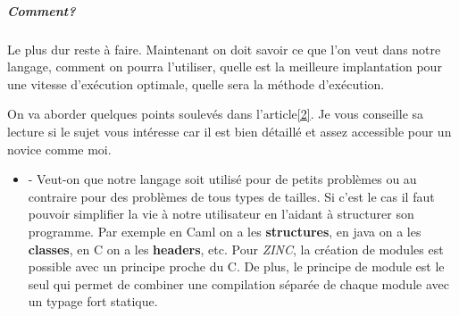 \documentclass[10pt,a4paper]{report}
\begin{document}
\subparagraph{Comment?}	
Le plus dur reste à faire. Maintenant on doit savoir ce que l'on veut dans notre langage, comment on pourra l'utiliser, quelle
est la meilleure implantation pour une vitesse d'exécution optimale, quelle sera la méthode d'exécution. 
\medbreak

On va aborder quelques points soulevés dans l'article\hyperref[ZINC]{[2]}. Je vous conseille sa lecture si le sujet vous intéresse
car il est bien détaillé et assez accessible pour un novice comme moi.
\begin{itemize}
	\item[] - Veut-on que notre langage soit utilisé pour de petits problèmes ou au contraire pour des problèmes de tous types de tailles.
	Si c'est le cas il faut pouvoir simplifier la vie à notre utilisateur en l'aidant à structurer son programme. Par exemple en Caml
	on a les \textbf{structures}, en java on a les \textbf{classes}, en C on a les \textbf{headers}, etc. Pour \textit{ZINC},
	la création de modules est possible avec un principe proche du C. De plus, le principe de module est le seul qui permet de combiner
	une compilation séparée de chaque module avec un typage fort statique.
	\medbreak
	

\end{itemize}
\end{document}
